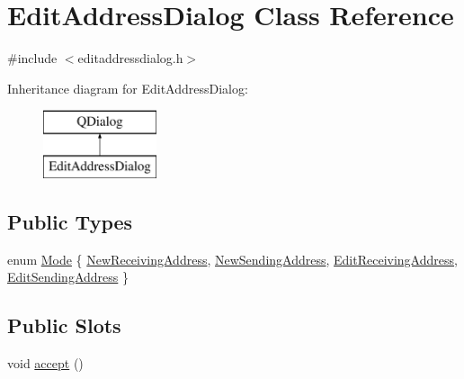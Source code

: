 \hypertarget{class_edit_address_dialog}{}\section{Edit\+Address\+Dialog Class Reference}
\label{class_edit_address_dialog}


{\ttfamily \#include $<$editaddressdialog.\+h$>$}

Inheritance diagram for Edit\+Address\+Dialog\+:\begin{figure}[H]
\begin{center}
\leavevmode
\includegraphics[height=2.000000cm]{class_edit_address_dialog}
\end{center}
\end{figure}
\subsection*{Public Types}
\begin{DoxyCompactItemize}
\item 
enum \hyperlink{class_edit_address_dialog_a456fdd27ee1c150824241ded7bb4de3a}{Mode} \{ \hyperlink{class_edit_address_dialog_a456fdd27ee1c150824241ded7bb4de3aa449a42099e353016ccdfbe714f7d2fda}{New\+Receiving\+Address}, 
\hyperlink{class_edit_address_dialog_a456fdd27ee1c150824241ded7bb4de3aa3b6348db9c19ac481a3cde94ac9cf65c}{New\+Sending\+Address}, 
\hyperlink{class_edit_address_dialog_a456fdd27ee1c150824241ded7bb4de3aa9fb7cde7f74d41aa4439d6c1a8b53507}{Edit\+Receiving\+Address}, 
\hyperlink{class_edit_address_dialog_a456fdd27ee1c150824241ded7bb4de3aa16a8a82d7d10059eb7c03952438aa193}{Edit\+Sending\+Address}
 \}
\end{DoxyCompactItemize}
\subsection*{Public Slots}
\begin{DoxyCompactItemize}
\item 
void \hyperlink{class_edit_address_dialog_ac52b71129806bccf6533d0e9441393b6}{accept} ()
\end{DoxyCompactItemize}
